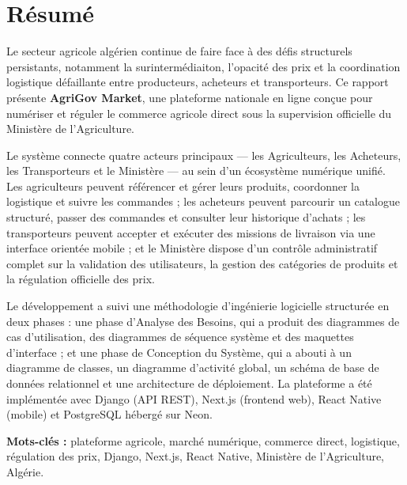 \chapter*{Résumé}

Le secteur agricole algérien continue de faire face à des défis structurels persistants, notamment la surintermédiaiton, l'opacité des prix et la coordination logistique défaillante entre producteurs, acheteurs et transporteurs. Ce rapport présente \textbf{AgriGov Market}, une plateforme nationale en ligne conçue pour numériser et réguler le commerce agricole direct sous la supervision officielle du Ministère de l'Agriculture.

Le système connecte quatre acteurs principaux — les Agriculteurs, les Acheteurs, les Transporteurs et le Ministère — au sein d'un écosystème numérique unifié. Les agriculteurs peuvent référencer et gérer leurs produits, coordonner la logistique et suivre les commandes ; les acheteurs peuvent parcourir un catalogue structuré, passer des commandes et consulter leur historique d'achats ; les transporteurs peuvent accepter et exécuter des missions de livraison via une interface orientée mobile ; et le Ministère dispose d'un contrôle administratif complet sur la validation des utilisateurs, la gestion des catégories de produits et la régulation officielle des prix.

Le développement a suivi une méthodologie d'ingénierie logicielle structurée en deux phases : une phase d'Analyse des Besoins, qui a produit des diagrammes de cas d'utilisation, des diagrammes de séquence système et des maquettes d'interface ; et une phase de Conception du Système, qui a abouti à un diagramme de classes, un diagramme d'activité global, un schéma de base de données relationnel et une architecture de déploiement. La plateforme a été implémentée avec Django (API REST), Next.js (frontend web), React Native (mobile) et PostgreSQL hébergé sur Neon.

\vspace{0.5cm}
\noindent\textbf{Mots-clés :} plateforme agricole, marché numérique, commerce direct, logistique, régulation des prix, Django, Next.js, React Native, Ministère de l'Agriculture, Algérie.

